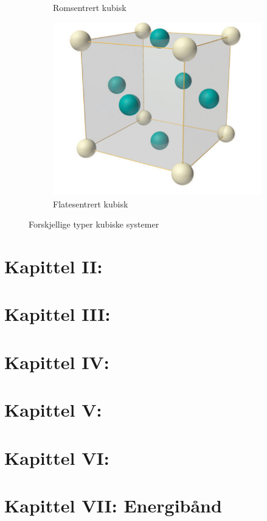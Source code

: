 \documentclass{article}
\begin{document}
\begin{figure}[h!]
\begin{subfigure}{0.3\textwidth}
    \caption{Romsentrert kubisk}
    \label{fig:romsentert_kubisk}
  \end{subfigure}
  \begin{subfigure}{0.3\textwidth}
    \includegraphics[width=\linewidth]{bilder/flatesentrert_kubisk.png}
    \caption{Flatesentrert kubisk}
    \label{fig:flatesentrert_kubisk}
  \end{subfigure}
  \caption{Forskjellige typer kubiske systemer}
  \label{fig:kubiske_interpolasjoner}
\end{figure}
\newpage
\section{Kapittel II: }
\newpage
\section{Kapittel III: }
\newpage
\section{Kapittel IV: }
\newpage
\section{Kapittel V: }
\newpage
\section{Kapittel VI: }
\newpage
\section{Kapittel VII: Energibånd }
\end{document}
